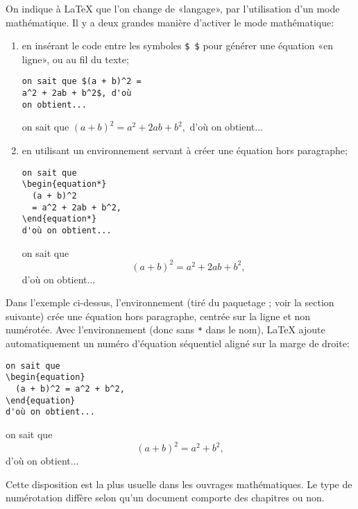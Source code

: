 On indique à {\LaTeX} que l'on change de «langage», par l'utilisation
d'un mode mathématique. Il y a deux grandes manière d'activer le mode
mathématique:
\begin{enumerate}
\item en insérant le code entre les symboles \verb=$ $= pour générer
  une équation «en ligne», ou au fil du texte;
  \begin{demo}
    \begin{texample}
\begin{lstlisting}
on sait que $(a + b)^2 =
a^2 + 2ab + b^2$, d'où
on obtient...
\end{lstlisting}
      \producing
      on sait que $(a + b)^2 = a^2 + 2ab + b^2,$ d'où on obtient...
    \end{texample}
  \end{demo}
\item en utilisant un environnement servant à créer une équation hors
  paragraphe;
  \begin{demo}
    \begin{texample}
\begin{lstlisting}
on sait que
\begin{equation*}
  (a + b)^2
  = a^2 + 2ab + b^2,
\end{equation*}
d'où on obtient...
\end{lstlisting}
      \producing
      on sait que
      \begin{equation*}
        (a + b)^2 = a^2 + 2ab + b^2,
      \end{equation*}
      d'où on obtient...
    \end{texample}
  \end{demo}
\end{enumerate}

Dans l'exemple ci-dessus, l'environnement  (tiré du
paquetage ; voir la section suivante) crée une
équation hors paragraphe, centrée sur la ligne et non numérotée. Avec
l'environnement  (donc sans \verb=*= dans le nom),
{\LaTeX} ajoute automatiquement un numéro d'équation séquentiel aligné
sur la marge de droite:
\begin{demo}
  \begin{texample}
\begin{lstlisting}
on sait que
\begin{equation}
  (a + b)^2 = a^2 + b^2,
\end{equation}
d'où on obtient...
\end{lstlisting}
    \producing
    on sait que
    \begin{equation}
      (a + b)^2 = a^2 + b^2,
    \end{equation}
    d'où on obtient...
  \end{texample}
\end{demo}
Cette disposition est la plus usuelle dans les ouvrages mathématiques.
Le type de numérotation diffère selon qu'un document comporte des
chapitres ou non.


